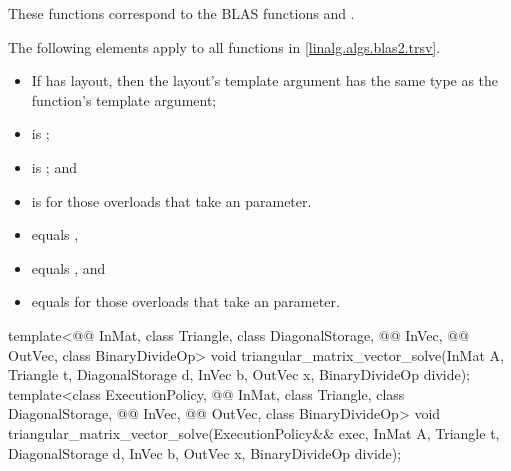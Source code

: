 \pnum
\begin{note}
These functions correspond to the BLAS functions
 and .
\end{note}

\pnum
The following elements apply to all functions in \ref{linalg.algs.blas2.trsv}.

\pnum
\mandates
\begin{itemize}
\item
If  has  layout,
then the layout's  template argument has
the same type as the function's  template argument;
\item
{}
is ;
\item
{}
is ; and
\item
{}
is  for those overloads that take an  parameter.
\end{itemize}

\pnum
\expects
\begin{itemize}
\item
{} equals ,
\item
{} equals , and
\item
{} equals 
for those overloads that take an  parameter.
\end{itemize}

\begin{itemdecl}
  template<@@ InMat, class Triangle, class DiagonalStorage,
           @@ InVec, @@ OutVec, class BinaryDivideOp>
    void triangular_matrix_vector_solve(InMat A, Triangle t, DiagonalStorage d,
                                        InVec b, OutVec x, BinaryDivideOp divide);
  template<class ExecutionPolicy, @@ InMat, class Triangle, class DiagonalStorage,
           @@ InVec, @@ OutVec, class BinaryDivideOp>
    void triangular_matrix_vector_solve(ExecutionPolicy&& exec,
                                        InMat A, Triangle t, DiagonalStorage d,
                                        InVec b, OutVec x, BinaryDivideOp divide);
\end{itemdecl}

